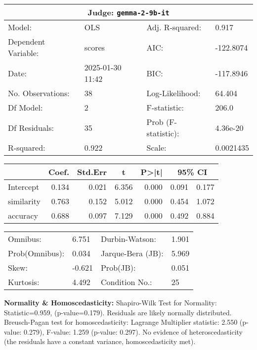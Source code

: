 \begin{center}
\small
\begin{tabular}{llll}
\toprule
\multicolumn{4}{c}{\textbf{Judge:} \texttt{gemma-2-9b-it} \citep{gemmateam2024gemma2improvingopen}} \\
\midrule
Model: & OLS & Adj. R-squared: & 0.917 \\
Dependent Variable: & scores & AIC: & -122.8074 \\
Date: & 2025-01-30 11:42 & BIC: & -117.8946 \\
No. Observations: & 38 & Log-Likelihood: & 64.404 \\
Df Model: & 2 & F-statistic: & 206.0 \\
Df Residuals: & 35 & Prob (F-statistic): & 4.36e-20 \\
R-squared: & 0.922 & Scale: & 0.0021435 \\
\bottomrule
\end{tabular}

\vspace{5pt}
\begin{tabular}{lrrrrrr}
\toprule
 & \multicolumn{1}{c}{Coef.} & \multicolumn{1}{c}{Std.Err} & \multicolumn{1}{c}{t} & \multicolumn{1}{c}{P>|t|} & \multicolumn{2}{c}{95\% CI} \\
\midrule
Intercept & 0.134 & 0.021 & 6.356 & 0.000 & 0.091 & 0.177 \\
similarity & 0.763 & 0.152 & 5.012 & 0.000 & 0.454 & 1.072 \\
accuracy & 0.688 & 0.097 & 7.129 & 0.000 & 0.492 & 0.884 \\
\bottomrule
\end{tabular}

\vspace{5pt}
\begin{tabular}{@{}ll@{\hspace{15pt}}ll@{}}
\toprule
Omnibus: & 6.751 & Durbin-Watson: & 1.901 \\
Prob(Omnibus): & 0.034 & Jarque-Bera (JB): & 5.969 \\
Skew: & -0.621 & Prob(JB): & 0.051 \\
Kurtosis: & 4.492 & Condition No.: & 25 \\
\bottomrule
\end{tabular}
\end{center}

\textbf{Normality \& Homoscedasticity:} Shapiro-Wilk Test for Normality: Statistic=0.959, (p-value=0.179).
Residuals are likely normally distributed.
Breusch-Pagan test for homoscedasticity:
Lagrange Multiplier statistic: 2.550
(p-value: 0.279), 
F-value: 1.259
(p-value: 0.297). 
No evidence of heteroscedasticity (the residuals have a constant variance, homoscedasticity met).

